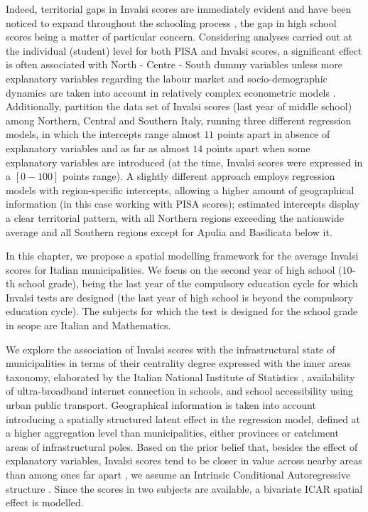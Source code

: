 \documentclass[openany]{book}
\begin{document}
 Indeed, territorial gaps in Invalsi scores are immediately evident and have been noticed to expand throughout the schooling process \citep{Invalsi2020}, the gap in high school scores being a matter of particular concern.  Considering analyses carried out at the individual (student) level for both PISA and Invalsi scores, a significant effect is often associated with North - Centre - South dummy variables  \citep[as in e.g. ][]{Giancola, Bratti, Agasisti, UniromaWP1} unless more explanatory variables regarding the labour market and socio-demographic dynamics are taken into account in relatively complex econometric models \citep{Bratti}. Additionally, \cite{Agasisti} partition the data set of Invalsi scores (last year of middle school) among Northern, Central and Southern Italy, running three different regression models, in which the intercepts range almost $11$ points apart in absence of explanatory variables and as far as almost $14$ points apart when some explanatory variables are introduced (at the time, Invalsi scores were expressed in a $[0-100]$ points range). A slightly different approach employs regression models with region-specific intercepts, allowing a higher amount of geographical information \citep{Matteucci} (in this case working with PISA scores); estimated intercepts display a clear territorial pattern, with all Northern regions exceeding the nationwide average and all Southern regions except for Apulia and Basilicata below it.
 
 In this chapter, we propose a spatial modelling framework for the average Invalsi scores for Italian municipalities. We focus on the second year of high school ($10$-th school grade), being the last year of the compulsory education cycle for which Invalsi tests are designed (the last year of high school is beyond the compulsory education cycle). The subjects for which the test is designed for the school grade in scope are Italian and Mathematics.

We explore the association of Invalsi scores with the infrastructural state of municipalities in terms of their centrality degree expressed with the inner areas taxonomy, elaborated by the Italian National Institute of Statistics \citep[ISTAT hereinafter, ][]{InnerAreas}, availability of ultra-broadband internet connection in schools, and school accessibility using urban public transport. Geographical information is taken into account introducing a spatially structured latent effect in the regression model, defined at a higher aggregation level than municipalities, either provinces or catchment areas of infrastructural poles. Based on the prior belief that, besides the effect of explanatory variables, Invalsi scores tend to be closer in value across nearby areas than among ones far apart \citep{CAR}, we assume an Intrinsic Conditional Autoregressive structure \citep[hereinafter ICAR, ][]{BYM}. Since the scores in two subjects are available, a bivariate ICAR \citep{Mardia} spatial effect is modelled.
\end{document}
